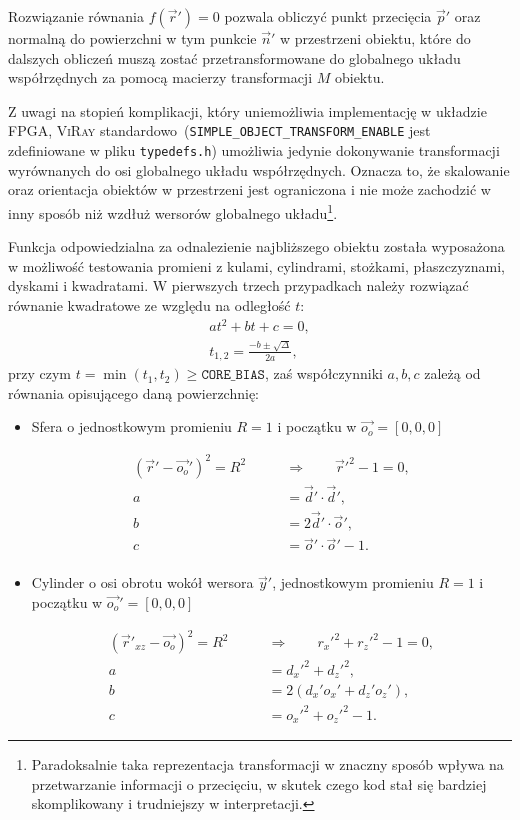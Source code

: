 \begin{enumerate}
Rozwiązanie równania $f(\vec{r}') = 0$ pozwala obliczyć punkt przecięcia $\vec{p}'$ oraz normalną do powierzchni  w tym punkcie $\vec{n}'$ w przestrzeni obiektu, które do dalszych obliczeń muszą zostać przetransformowane do globalnego układu współrzędnych za pomocą macierzy transformacji $M$ obiektu.

Z uwagi na stopień komplikacji, który uniemożliwia implementację w układzie FPGA, \textsc{ViRay} standardowo~(\texttt{SIMPLE\_OBJECT\_TRANSFORM\_ENABLE} jest zdefiniowane w pliku \texttt{typedefs.h}) umożliwia jedynie dokonywanie transformacji wyrównanych do osi globalnego układu współrzędnych. Oznacza to, że skalowanie oraz orientacja obiektów w przestrzeni jest ograniczona i nie może zachodzić w inny sposób niż wzdłuż wersorów globalnego układu\footnote{Paradoksalnie taka reprezentacja transformacji w znaczny sposób wpływa na przetwarzanie informacji o przecięciu, w skutek czego kod stał się bardziej skomplikowany i trudniejszy w interpretacji.}. 

Funkcja odpowiedzialna za odnalezienie najbliższego obiektu została wyposażona w możliwość testowania promieni z kulami, cylindrami, stożkami, płaszczyznami, dyskami i kwadratami. W pierwszych trzech przypadkach należy rozwiązać równanie kwadratowe ze względu na odległość $t$:
\begin{align*}
at^2 + bt + c = 0,\\
t_{1,2} = \frac{-b\pm\sqrt{\Delta}}{2a},
\end{align*}
przy czym $t = \min(t_1, t_2) \geq \mathtt{CORE\_BIAS}$, zaś współczynniki $a, b, c$ zależą od równania opisującego daną powierzchnię:
\begin{itemize}
\item Sfera o jednostkowym promieniu $R=1$ i początku w $\vec{o_o} = [0,0,0]$

\begin{align*}
(\vec{r}' - \vec{o_o}')^2 = R^2\qquad &\Rightarrow \qquad\vec{r}'^2 - 1 = 0,\\
a &= \vec{d}'\cdot\vec{d}',\\
b &= 2\vec{d}'\cdot\vec{o}',\\
c &= \vec{o}'\cdot\vec{o}' - 1.\\
\end{align*}

\item Cylinder o osi obrotu wokół wersora $\vec{y}'$, jednostkowym promieniu $R=1$ i początku w $\vec{o_o}' = [0,0,0]$

\begin{align*}
(\vec{r}'_{xz} - \vec{o_o})^2 = R^2\qquad &\Rightarrow\qquad r_x'^2 + r_z'^2 - 1 = 0,\\
a &= d_x'^2 + d_z'^2,\\
b &= 2\left(d_x'o_x' + d_z'o_z' \right),\\
c &= o_x'^2 + o_z'^2 - 1.
\end{align*}


\end{itemize}
\end{enumerate}

